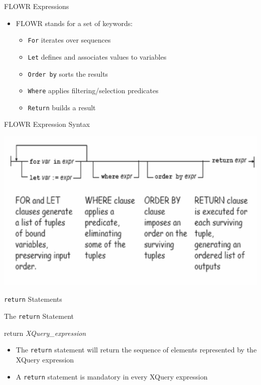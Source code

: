 \documentclass[svgnames]{beamer}
\begin{document}
\begin{frame}[fragile]{FLOWR Expressions}
\begin{itemize}
	\item FLOWR stands for a set of keywords:
	\begin{itemize}
		\item \texttt{For} iterates over sequences
		\item \texttt{Let} defines and associates values to variables
		\item \texttt{Order by} sorts the results
		\item \texttt{Where} applies filtering/selection predicates
		\item \texttt{Return} builds a result
	\end{itemize}
\end{itemize}
\end{frame}

\begin{frame}[fragile]{FLOWR Expression Syntax}
	\begin{center}
		\includegraphics[scale=0.50]{flowr.pdf}
	\end{center}
\end{frame}

\begin{frame}[fragile]{\texttt{return} Statements}
\small
\begin{block}{The \texttt{return} Statement}
\begin{semiverbatim}
return \textit{XQuery\_expression}
\end{semiverbatim}
\end{block}
\normalsize
\begin{itemize}
	\item The \texttt{return} statement will return the sequence of elements represented by the XQuery expression
	\item A \texttt{return} statement is mandatory in every XQuery expression
\end{itemize}
\end{frame}
\end{document}
